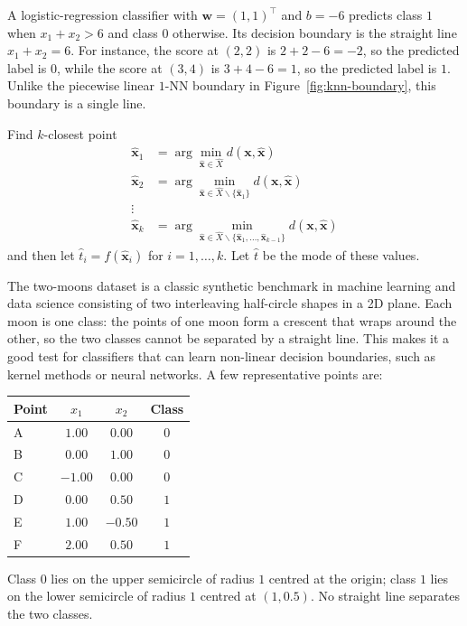 \documentclass[a4paper, 12pt]{book}
\begin{document}
\begin{example}
    A logistic-regression classifier with $\mathbf{w}=(1,1)^\top$ and $b=-6$
    predicts class $1$ when $x_1+x_2>6$ and class $0$ otherwise. Its decision
    boundary is the straight line $x_1+x_2=6$. For instance, the score at
    $(2,2)$ is $2+2-6=-2$, so the predicted label is $0$, while the score at
    $(3,4)$ is $3+4-6=1$, so the predicted label is $1$. Unlike the piecewise
    linear $1$-NN boundary in Figure~\ref{fig:knn-boundary}, this boundary is a
    single line.
\end{example}

\begin{problem}
    Find $k$-closest point
    \begin{align}
        \hat{\mathbf{x}}_1 &= \arg\min_{\hat{\mathbf{x}} \in \hat{X}} d(\mathbf{x}, \hat{\mathbf{x}}) \\
    \hat{\mathbf{x}}_2 &= \arg\min_{\hat{\mathbf{x}} \in \hat{X} \backslash \{\hat{\mathbf{x}}_1\}} d(\mathbf{x}, \hat{\mathbf{x}}) \\
                \vdots \\
    \hat{\mathbf{x}}_k &= \arg\min_{\hat{\mathbf{x}} \in \hat{X} \backslash \{\hat{\mathbf{x}}_1, \ldots, \hat{\mathbf{x}}_{k-1}\}} d(\mathbf{x}, \hat{\mathbf{x}})
   \end{align}
   and then let $\hat{t}_i = f(\hat{\mathbf{x}}_i)$ for $i = 1, \ldots, k$. Let $\hat{t}$ be the mode of these values.
\end{problem}

\begin{example}
    The two-moons dataset is a classic synthetic benchmark in machine learning and data science consisting of two interleaving half-circle shapes in a 2D plane. Each moon is one class: the points of one moon form a crescent that wraps around the other, so the two classes cannot be separated by a straight line. This makes it a good test for classifiers that can learn non-linear decision boundaries, such as kernel methods or neural networks.
    A few representative points are:
    \begin{center}
    \begin{tabular}{@{}lccc@{}}
        \toprule
        Point & $x_1$ & $x_2$ & Class \\
        \midrule
        A & $1.00$ & $0.00$ & $0$ \\
        B & $0.00$ & $1.00$ & $0$ \\
        C & $-1.00$ & $0.00$ & $0$ \\
        D & $0.00$ & $0.50$ & $1$ \\
        E & $1.00$ & $-0.50$ & $1$ \\
        F & $2.00$ & $0.50$ & $1$ \\
        \bottomrule
    \end{tabular}
    \end{center}
    Class $0$ lies on the upper semicircle of radius $1$ centred at the origin;
    class $1$ lies on the lower semicircle of radius $1$ centred at $(1,0.5)$.
    No straight line separates the two classes.
\end{example}
\end{document}

